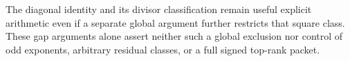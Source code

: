 The diagonal identity and its divisor classification remain useful
explicit arithmetic even if a separate global argument further
restricts that square class. These gap arguments alone assert neither
such a global exclusion nor control of odd exponents, arbitrary
residual classes, or a full signed top-rank packet.
